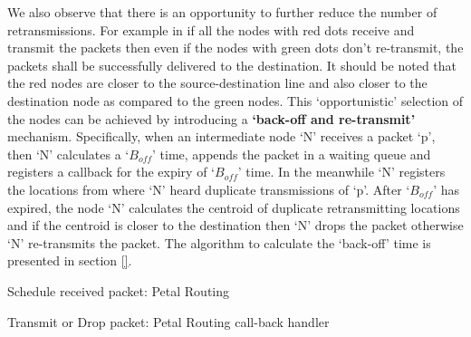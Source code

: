 We also observe that there is an opportunity to further reduce the number of retransmissions. For example in \fref{} if all the nodes with red dots receive and transmit the packets then even if the nodes with green dots don't re-transmit, the packets shall be successfully delivered to the destination. It should be noted that the red nodes are closer to the source-destination line and also closer to the destination node as compared to the green nodes. This `opportunistic' selection of the nodes can be achieved by introducing a \textbf{`back-off and re-transmit'} mechanism. Specifically, when an intermediate node `N' receives a packet `p', then `N' calculates a `$B_{off}$' time, appends the packet in a waiting queue and registers a callback for the expiry of `$B_{off}$' time. In the meanwhile `N' registers the locations from where `N' heard duplicate transmissions of `p'. After `$B_{off}$' has expired, the node `N' calculates the centroid of duplicate retransmitting locations and if the centroid is closer to the destination then `N' drops the packet otherwise `N' re-transmits the packet. The algorithm to calculate the `back-off' time is presented in section \ref{}.

\begin{algorithm}
\caption{Schedule received packet: Petal Routing} 
\label{packet_scheduling}
\DontPrintSemicolon
{}

\end{algorithm}

\begin{algorithm}
\caption{Transmit or Drop packet: Petal Routing call-back handler} 
\label{call_back_handler}
\DontPrintSemicolon
{}
\end{algorithm}

